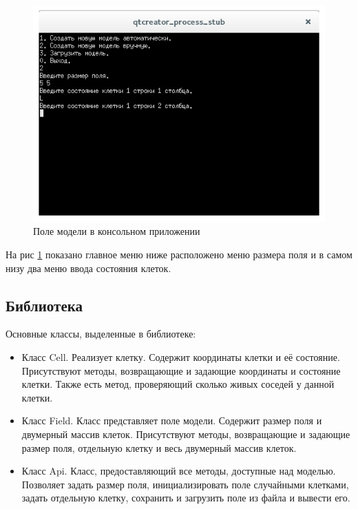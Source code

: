 \documentclass[a4paper]{article}
\begin{document}
\begin{figure}[H]
	\begin{center}
		\includegraphics[scale=0.5]{console3}
		\caption{Поле модели в консольном приложении} 
		\label{pic:cellMenu} %
	\end{center}
\end{figure}

На рис \ref{pic:cellMenu} показано главное меню ниже расположено меню размера поля и в самом низу два меню ввода состояния клеток. 

\subsection{Библиотека}
\noindent Основные классы, выделенные в библиотеке:
\begin{itemize}
\item Класс Cell. Реализует клетку. Содержит координаты клетки и её состояние. Присутствуют методы, возвращающие и задающие координаты и состояние клетки. Также есть метод, проверяющий сколько живых соседей у данной клетки.
\item Класс Field. Класс представляет поле модели. Содержит размер поля и двумерный массив клеток. Присутствуют методы, возвращающие и задающие размер поля, отдельную клетку и весь двумерный массив клеток.	
\item Класс Api. Класс, предоставляющий все методы, доступные над моделью. Позволяет задать размер поля, инициализировать поле случайными клетками, задать отдельную клетку, сохранить и загрузить поле из файла и вывести его.
\end{itemize}
\end{document}
